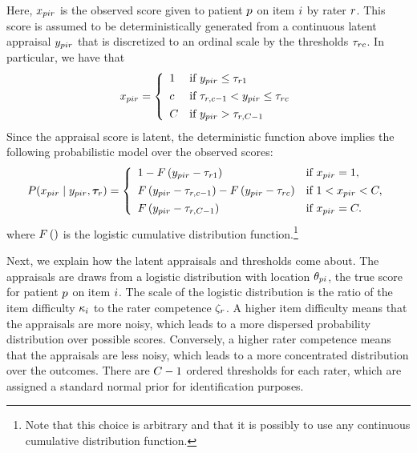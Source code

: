 \documentclass[a4paper,11pt]{article}
\begin{document}
Here, $x_{pir}$ is the observed score given to patient $p$ on item $i$ by rater $r$.
This score is assumed to be deterministically generated from a continuous latent appraisal $y_{pir}$ that is discretized to an ordinal scale by the thresholds $\tau_{rc}$.
In particular, we have that
\begin{align*}
\oneScore =
\left\{\begin{array}{ll}
1		& \text{if }  \Appraisal_{\Ipatient\Iitem\Irater} \leq \Threshold_{\Irater 1} \\[4pt]
\Incat	& \text{if }  \Threshold_{\Irater, \Incat - 1} < \Appraisal_{\Ipatient\Iitem\Irater} \leq \Threshold_{\Irater\Incat} \\[4pt]
\Tncat	& \text{if }  \Appraisal_{\Ipatient\Iitem\Irater} > \Threshold_{\Irater,\Tncat-1}
\end{array} \right.
\end{align*}
Since the appraisal score is latent, the deterministic function above implies the following probabilistic model over the observed scores:
\begin{align*}
P(\oneScore\mid \oneAppraisal,\bm{\Threshold}_{\Irater}) =
\left\{\begin{array}{ll}
1 - \cdf{\Appraisal_{\Ipatient\Iitem\Irater} - \Threshold_{\Irater 1}}         & \text{if } \oneScore = 1, \\[4pt]
\cdf{\oneAppraisal - \Threshold_{\Irater,\Incat-1}} -
\cdf{\oneAppraisal - \Threshold_{\Irater\Incat}}         & \text{if } 1 < \oneScore < \Tncat,\\[4pt]
\cdf{\oneAppraisal - \Threshold_{\Irater,\Tncat-1}}       & \text{if } \oneScore = \Tncat.
\end{array} \right.
\end{align*}
where $F\left(\right)$ is the logistic cumulative distribution function.\footnote{%
	Note that this choice is arbitrary and that it is possibly to use any continuous cumulative distribution function.
}

Next, we explain how the latent appraisals and thresholds come about.
The appraisals are draws from a logistic distribution with location $\theta_{pi}$, the true score for patient $p$ on item $i$. The scale of the logistic distribution is the ratio of the item difficulty $\kappa_i$ to the rater competence $\zeta_r$.
A higher item difficulty means that the appraisals are more noisy, which leads to a more dispersed probability distribution over possible scores.
Conversely, a higher rater competence means that the appraisals are less noisy, which leads to a more concentrated distribution over the outcomes.
There are $\Tncat - 1$ ordered thresholds for each rater, which are assigned a standard normal prior for identification purposes.
\end{document}
